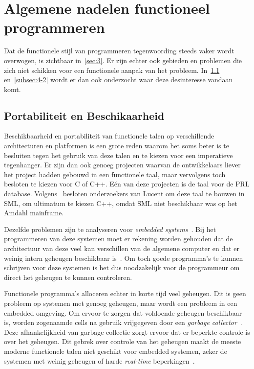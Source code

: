 \documentclass[twoside,twocolumn]{article}
\begin{document}
\section{Algemene nadelen functioneel programmeren}
\label{sec:4}

Dat de functionele stijl van programmeren tegenwoording steeds vaker wordt
overwogen, is zichtbaar in~\cref{sec:3}. Er zijn echter ook gebieden en
problemen die zich niet schikken voor een functionele aanpak van het probleem.
In~\cref{subsec:4-1} en~\cref{subsec:4-2} wordt er dan ook onderzocht waar deze
desinteresse vandaan komt.

\subsection{Portabiliteit en Beschikaarheid}
\label{subsec:4-1}

Beschikbaarheid en portabiliteit van functionele talen op verschillende
architecturen en platformen is een grote reden waarom het soms beter is te
besluiten tegen het gebruik van deze talen en te kiezen voor een imperatieve
tegenhanger. Er zijn dan ook genoeg projecten waarvan de ontwikkelaars liever
het project hadden gebouwd in een functionele taal, maar vervolgens toch
besloten te kiezen voor C of C++. E\'en van deze projecten is de taal voor de
PRL database. Volgens~\textcite{src19} besloten onderzoekers van Lucent om
deze taal te bouwen in SML, om ultimatum te kiezen C++, omdat SML niet
beschikbaar was op het Amdahl mainframe.

Dezelfde problemen zijn te analyseren voor
\textit{embedded systems}~\cite{src20}. Bij het programmeren van deze systemen
moet er rekening worden gehouden dat de architectuur van deze veel kan
verschillen van de algemene computer en dat er weinig intern geheugen
beschikbaar is~\cite{src21,src22}. Om toch goede programma's te kunnen
schrijven voor deze systemen is het dus noodzakelijk voor de programmeur om
direct het geheugen te kunnen controleren.

Functionele programma's alloceren echter in korte tijd veel geheugen. Dit is
geen probleem op systemen met genoeg geheugen, maar wordt een probleem in
een embedded omgeving. Om ervoor te zorgen dat voldoende geheugen beschikbaar
is, worden zogenaamde cells na gebruik vrijgegeven door een \textit{garbage
collector}~\cite{src23}. Deze afhankelijkheid van garbage collectie zorgt ervoor dat er
beperkte controle is over het geheugen. Dit gebrek over controle van het
geheugen maakt de meeste moderne functionele talen niet geschikt voor embedded
systemen, zeker de systemen met weinig geheugen of harde \textit{real-time}
beperkingen~\cite{src24}.
\end{document}
